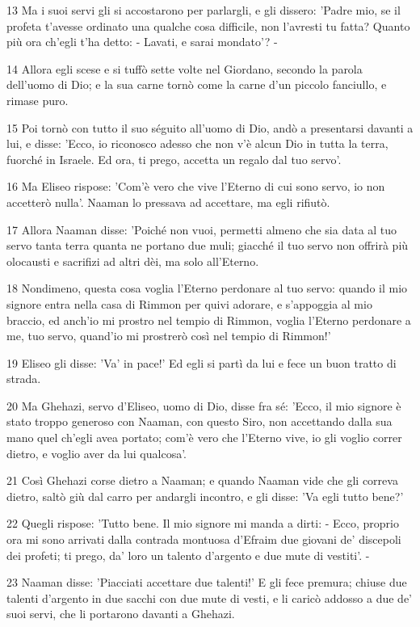 \par 13 Ma i suoi servi gli si accostarono per parlargli, e gli dissero: 'Padre mio, se il profeta t'avesse ordinato una qualche cosa difficile, non l'avresti tu fatta? Quanto più ora ch'egli t'ha detto: - Lavati, e sarai mondato'? -
\par 14 Allora egli scese e si tuffò sette volte nel Giordano, secondo la parola dell'uomo di Dio; e la sua carne tornò come la carne d'un piccolo fanciullo, e rimase puro.
\par 15 Poi tornò con tutto il suo séguito all'uomo di Dio, andò a presentarsi davanti a lui, e disse: 'Ecco, io riconosco adesso che non v'è alcun Dio in tutta la terra, fuorché in Israele. Ed ora, ti prego, accetta un regalo dal tuo servo'.
\par 16 Ma Eliseo rispose: 'Com'è vero che vive l'Eterno di cui sono servo, io non accetterò nulla'. Naaman lo pressava ad accettare, ma egli rifiutò.
\par 17 Allora Naaman disse: 'Poiché non vuoi, permetti almeno che sia data al tuo servo tanta terra quanta ne portano due muli; giacché il tuo servo non offrirà più olocausti e sacrifizi ad altri dèi, ma solo all'Eterno.
\par 18 Nondimeno, questa cosa voglia l'Eterno perdonare al tuo servo: quando il mio signore entra nella casa di Rimmon per quivi adorare, e s'appoggia al mio braccio, ed anch'io mi prostro nel tempio di Rimmon, voglia l'Eterno perdonare a me, tuo servo, quand'io mi prostrerò così nel tempio di Rimmon!'
\par 19 Eliseo gli disse: 'Va' in pace!' Ed egli si partì da lui e fece un buon tratto di strada.
\par 20 Ma Ghehazi, servo d'Eliseo, uomo di Dio, disse fra sé: 'Ecco, il mio signore è stato troppo generoso con Naaman, con questo Siro, non accettando dalla sua mano quel ch'egli avea portato; com'è vero che l'Eterno vive, io gli voglio correr dietro, e voglio aver da lui qualcosa'.
\par 21 Così Ghehazi corse dietro a Naaman; e quando Naaman vide che gli correva dietro, saltò giù dal carro per andargli incontro, e gli disse: 'Va egli tutto bene?'
\par 22 Quegli rispose: 'Tutto bene. Il mio signore mi manda a dirti: - Ecco, proprio ora mi sono arrivati dalla contrada montuosa d'Efraim due giovani de' discepoli dei profeti; ti prego, da' loro un talento d'argento e due mute di vestiti'. -
\par 23 Naaman disse: 'Piacciati accettare due talenti!' E gli fece premura; chiuse due talenti d'argento in due sacchi con due mute di vesti, e li caricò addosso a due de' suoi servi, che li portarono davanti a Ghehazi.
